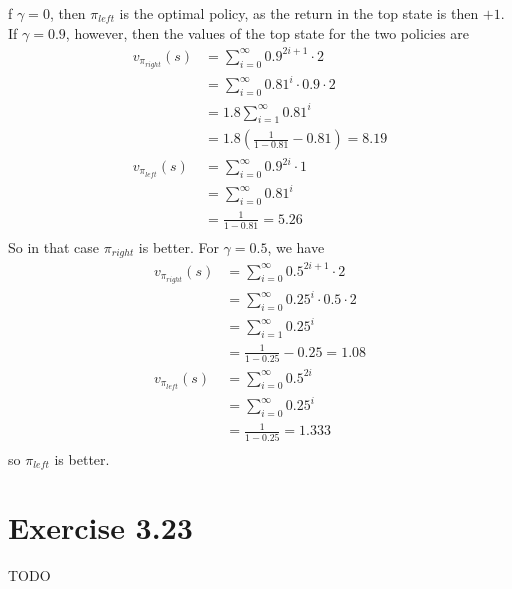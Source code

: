 \documentclass[a4paper,11pt,reqno]{amsart}
\begin{document}
f $\gamma =0$, then $\pi _{left}$ is the optimal policy, as the return in the top state is then $+1$. If $\gamma =0.9$, however, then the values of the top state for the two policies are
\begin{align}
    v_{\pi _{right}}(s) &= \sum_{i=0}^{\infty} 0.9^{2i + 1} \cdot 2\\
            &=\sum_{i=0}^{\infty} 0.81^{i} \cdot 0.9 \cdot 2 \\
            &= 1.8 \sum_{i=1}^{\infty} 0.81^{i} \\
            &= 1.8(\frac{1}{1 - 0.81} - 0.81)  = 8.19 \\
    v_{\pi _{left}}(s) &= \sum_{i=0}^{\infty} 0.9^{2i} \cdot 1\\
        &= \sum_{i=0}^{\infty} 0.81^{i} \\
        &= \frac{1}{1 - 0.81} = 5.26 \\
\end{align}
So in that case $\pi _{right}$ is better. For $\gamma =0.5$, we have
\begin{align}
    v_{\pi _{right}}(s) &= \sum_{i=0}^{\infty} 0.5^{2i + 1} \cdot 2\\
            &=\sum_{i=0}^{\infty} 0.25^{i} \cdot 0.5 \cdot 2 \\
            &= \sum_{i=1}^{\infty} 0.25^{i} \\
            &= \frac{1}{1 - 0.25 } - 0.25= 1.08 \\
    v_{\pi _{left}}(s) &= \sum_{i=0}^{\infty} 0.5^{2i}\\
        &= \sum_{i=0}^{\infty} 0.25^{i} \\
        &= \frac{1}{1 - 0.25} = 1.333 \\
\end{align}
so $\pi _{left}$ is better.


\section*{Exercise 3.23}
TODO
\end{document}
